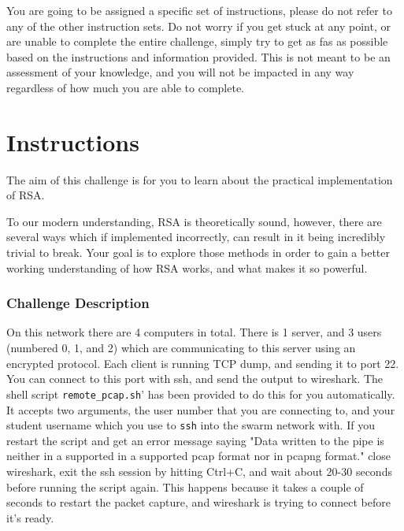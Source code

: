             {\parindent0pt\singlespacing                
                    You are going to be assigned a specific set of instructions, please do not refer to any of the other instruction sets.
                    Do not worry if you get stuck at any point, or are unable to complete the entire challenge, simply try to get as fas as possible based on the instructions and information provided. %
This is not meant to be an assessment of your knowledge, and you will not be impacted in any way regardless of how much you are able to complete. 
                
                \section*{Instructions}
                    The aim of this challenge is for you to learn about the practical implementation of RSA.

                    To our modern understanding, RSA is theoretically sound, however, there are several ways which if implemented incorrectly, can result in it being incredibly trivial to break. 
                    Your goal is to explore those methods in order to gain a better working understanding of how RSA works, and what makes it so powerful. 
                \subsubsection*{Challenge Description}
                    On this network there are 4 computers in total. 
                    There is 1 server, and 3 users (numbered 0, 1, and 2) which are communicating to this server using an encrypted protocol. 
                    Each client is running TCP dump, and sending it to port 22. %
You can connect to this port with ssh, and send the output to wireshark.
                    The shell script \lstinline`remote_pcap.sh`' has been provided to do this for you automatically. 
                    It accepts two arguments, the user number that you are connecting to, and your student username which you use to \lstinline`ssh` into the swarm network with.
                    If you restart the script and get an error message saying "Data written to the pipe is neither in a supported in a supported pcap format nor in pcapng format."
                    close wireshark, exit the ssh session by hitting Ctrl+C, and wait about 20-30 seconds before running the script again.
                    This happens because it takes a couple of seconds to restart the packet capture, and wireshark is trying to connect before it's ready.

}
